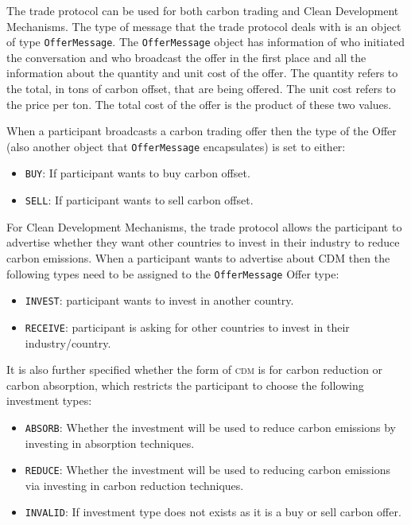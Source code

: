 The trade protocol can be used for both carbon trading and Clean Development Mechanisms. The type of message that the trade protocol deals with is an object of type \texttt{OfferMessage}. The \texttt{OfferMessage} object has information of who initiated the conversation and who broadcast the offer in the first place and all the information about the quantity and unit cost of the offer. The quantity refers to the total, in tons of carbon offset, that are being offered. The unit cost refers to the price per ton. The total cost of the offer is the product of these two values.

When a participant broadcasts a carbon trading offer then the type of the Offer (also another 
object that \texttt{OfferMessage} encapsulates) is set to either:
 
\begin{itemize}
	\item \texttt{BUY}: If participant wants to buy carbon offset.
	\item \texttt{SELL}: If participant wants to sell carbon offset.
\end{itemize}

For Clean Development Mechanisms, the trade protocol allows the participant to advertise whether they want other countries to invest in their industry to reduce carbon emissions. When a participant wants to advertise about CDM then the following types need to be assigned to the \texttt{OfferMessage} Offer type:

\begin{itemize}
	\item \texttt{INVEST}: participant wants to invest in another country.
	\item \texttt{RECEIVE}: participant is asking for other countries to invest in their industry/country.
\end{itemize}

It is also further specified whether the form of \textsc{cdm} is for carbon reduction or carbon absorption, which restricts the participant to choose the following investment types:

\begin{itemize}
	\item \texttt{ABSORB}: Whether the investment will be used to reduce carbon emissions by investing in absorption techniques.
	\item \texttt{REDUCE}: Whether the investment will be used to reducing carbon emissions via investing in carbon reduction techniques.
	\item \texttt{INVALID}: If investment type does not exists as it is a buy or sell carbon offer.
\end{itemize}

